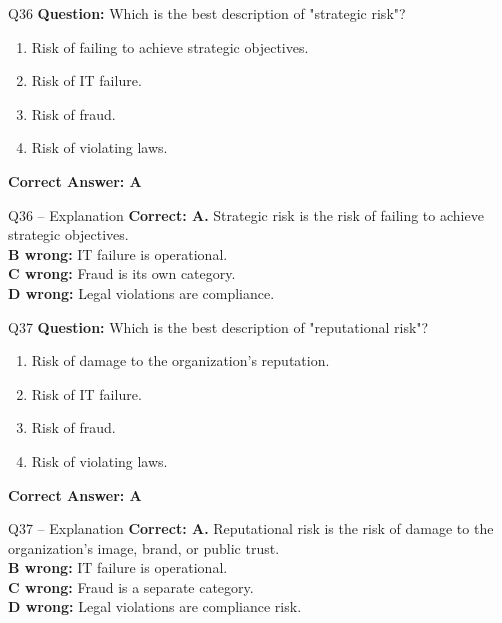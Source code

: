 \documentclass[aspectratio=169,10pt]{beamer}
\begin{document}
	\begin{frame}[t]{Q36}
		\small
		\textbf{Question:} Which is the best description of "strategic risk"?
		\begin{enumerate}[label=\Alph*.,itemsep=1pt,topsep=2pt]
			\item Risk of failing to achieve strategic objectives.
			\item Risk of IT failure.
			\item Risk of fraud.
			\item Risk of violating laws.
		\end{enumerate}
		\vspace{4pt}
		\textbf{Correct Answer: A}
	\end{frame}
	
	\begin{frame}[t]{Q36 -- Explanation}
		\small
		\textbf{Correct: A.} Strategic risk is the risk of failing to achieve strategic objectives. \\[4pt]
		\textbf{B wrong:} IT failure is operational. \\[2pt]
		\textbf{C wrong:} Fraud is its own category. \\[2pt]
		\textbf{D wrong:} Legal violations are compliance.
	\end{frame}
	
	\begin{frame}[t]{Q37}
		\small
		\textbf{Question:} Which is the best description of "reputational risk"?
		\begin{enumerate}[label=\Alph*.,itemsep=1pt,topsep=2pt]
			\item Risk of damage to the organization's reputation.
			\item Risk of IT failure.
			\item Risk of fraud.
			\item Risk of violating laws.
		\end{enumerate}
		\vspace{4pt}
		\textbf{Correct Answer: A}
	\end{frame}
	
	\begin{frame}[t]{Q37 -- Explanation}
		\small
		\textbf{Correct: A.} Reputational risk is the risk of damage to the organization's image, brand, or public trust. \\[4pt]
		\textbf{B wrong:} IT failure is operational. \\[2pt]
		\textbf{C wrong:} Fraud is a separate category. \\[2pt]
		\textbf{D wrong:} Legal violations are compliance risk.
	\end{frame}
	
\end{document}
